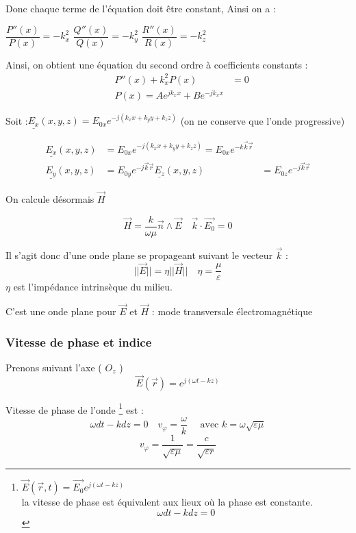 \documentclass[12pt,a4paper]{report}
\begin{document}
Donc chaque terme de l'équation doit être constant, Ainsi on a :

\(\dfrac{P''(x)}{P(x)} = -k_x^2\) \hfill \(\dfrac{Q''(x)}{Q(x)} = -k_y^2\) \hfill \(\dfrac{R''(x)}{R(x)} = -k_z^2\)

Ainsi, on obtient une équation du second ordre à coefficients constants :
\begin{align*}
	&P''(x) + k_x^2 P(x) &= 0\\
	&P(x) = Ae^{j k_x x} + B e^{-j k_x x}
\end{align*}

Soit :\(\underline{E_x} (x, y, z) = E_{0x} e^{-j (k_x x + k_y y + k_z z)}\) (on ne conserve que l'onde progressive)

\begin{align*}
	\underline{E_x} (x, y, z) &= E_{0x} e^{-j (k_x x + k_y y + k_z z)} = E_{0x} e^{-k \vec{k} \vec{r}}\\
	\underline{E_y} (x, y, z) &= E_{0y} e^{ -j \vec{k} \vec{r} }
	\underline{E_z} (x, y, z) &= E_{0z} e^{ -j \vec{k} \vec{r} }
\end{align*}

On calcule désormais \(\vec{H}\)

\[
	\vec{H} = \dfrac{k}{\omega \mu} \vec{n} \wedge \vec{E} \quad	\vec{k} \cdot \vec{E_0} = 0
\]

Il s'agit donc d'une onde plane se propageant suivant le vecteur \(\vec{k}\) :
\[
	\vert \vert \vec{E} \vert \vert = \eta \vert \vert \vec{H} \vert \vert \quad	\eta = \frac{\mu}{\varepsilon}
\]
\(\eta\) est l'impédance intrinsèque du milieu.

C'est une onde plane pour \(\vec{E}\) et \(\vec{H}\) : mode transversale électromagnétique

\subsubsection{Vitesse de phase et  indice}
Prenons suivant l'axe ( \(O_z\) )
\[
	\vec{E} (\vec{r} ) = e^{j ( \omega t - kz)}
\]

Vitesse de phase de l'onde \footnote{\(\vec{E} (\vec{r}, t) = \vec{E_0} e^{j(\omega t - k z)}\)\\ la vitesse de phase est équivalent aux lieux où la phase est constante.\[
	\omega dt - k dz = 0
\]} est :
\[
	\omega dt - k dz = 0 \quad v_\varphi = \dfrac{\omega}{k} \quad \text{ avec } k = \omega \sqrt{\varepsilon \mu}
\]
\[
	v_\varphi = \dfrac{1}{\sqrt{\varepsilon \mu}} = \dfrac{c}{\sqrt{\varepsilon r}}
\]
\end{document}
